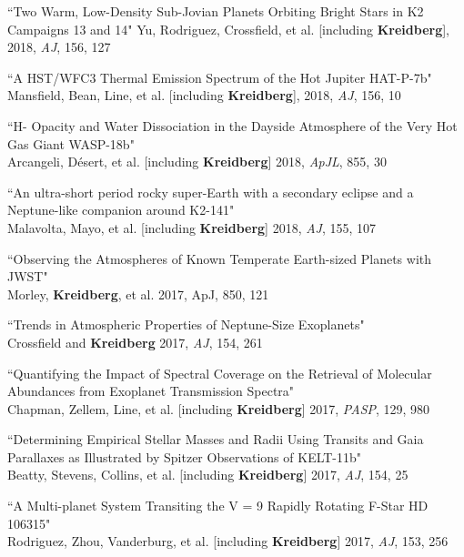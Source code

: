\documentclass[12pt,letterpaper]{article}
\begin{document}
\begin{compactenum}
\item ``Two Warm, Low-Density Sub-Jovian Planets Orbiting Bright Stars in K2 Campaigns 13 and 14"
	Yu, Rodriguez, Crossfield, et al. [including \textbf{Kreidberg}], 2018, \textit{AJ}, 156, 127 

\item ``A HST/WFC3 Thermal Emission Spectrum of the Hot Jupiter HAT-P-7b"\\
Mansfield, Bean, Line, et al. [including \textbf{Kreidberg}], 2018, \textit{AJ}, 156, 10

\item ``H- Opacity and Water Dissociation in the Dayside Atmosphere of the Very Hot Gas Giant WASP-18b"\\
	Arcangeli, D\'{e}sert, et al. [including \textbf{Kreidberg}] 2018, \textit{ApJL}, 855, 30 

\item ``An ultra-short period rocky super-Earth with a secondary eclipse and a Neptune-like companion around K2-141"\\
Malavolta, Mayo, et al. [including \textbf{Kreidberg}] 2018, \textit{AJ}, 155, 107 

\item ``Observing the Atmospheres of Known Temperate Earth-sized Planets with JWST"\\
Morley, \textbf{Kreidberg}, et al. 2017, ApJ, 850, 121 

\item ``Trends in Atmospheric Properties of Neptune-Size Exoplanets"\\
Crossfield and \textbf{Kreidberg} 2017, \textit{AJ}, 154, 261 

\item ``Quantifying the Impact of Spectral Coverage on the Retrieval of Molecular Abundances from Exoplanet Transmission Spectra"\\
Chapman, Zellem, Line, et al. [including \textbf{Kreidberg}] 2017, \textit{PASP}, 129, 980

\item ``Determining Empirical Stellar Masses and Radii Using Transits and Gaia Parallaxes as Illustrated by Spitzer Observations of KELT-11b"\\
Beatty, Stevens, Collins, et al. [including \textbf{Kreidberg}] 2017, \textit{AJ}, 154, 25 

\item ``A Multi-planet System Transiting the V = 9 Rapidly Rotating F-Star HD 106315"\\
Rodriguez, Zhou, Vanderburg, et al. [including \textbf{Kreidberg}] 2017, \textit{AJ}, 153, 256


\end{compactenum}
\end{document}
